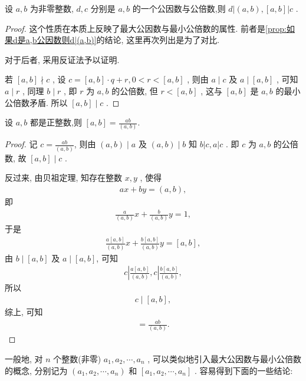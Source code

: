 \begin{property}
	设 $a ,  b$ 为非零整数, $d ,  c$ 分别是 $a ,  b$ 的一个公因数与公倍数,则 $d|(a, b),[a, b]| c$ .
\end{property}
\begin{proof}
	这个性质在本质上反映了最大公因数与最小公倍数的属性. 前者是\autoref{prop:如果d是a,b公因数则d|(a,b)}的结论, 这里再次列出是为了对比.

	对于后者, 采用反证法予以证明.

	若 $[a, b] \nmid c$ , 设 $c=[a, b] \cdot q+r, 0<r<[a, b]$ , 则由 $a \mid c$ 及 $a \mid[a, b]$ , 可知 $a \mid r$ , 同理 $b \mid r$ , 即 $r$ 为 $a ,  b$ 的公倍数, 但 $r<[a, b]$ , 这与 $[a, b]$ 是 $a ,  b$ 的最小公倍数矛盾. 所以 $[a, b] \mid c$ .
\end{proof}

\begin{property}\label{prop:最大公因数与最小公倍数的关系}
	设 $a ,  b$ 都是正整数,则 $[a, b]=\frac{a b}{(a, b)}$.
\end{property}
\begin{proof}
	记 $c=\frac{a b}{(a, b)}$, 则由 $(a, b) \mid a$ 及 $(a, b) \mid b$ 知 $b|c, a| c$ . 即 $c$ 为 $a ,  b$ 的公倍数, 故 $[a, b] \mid c$ .

	反过来, 由贝祖定理, 知存在整数 $x ,  y$ , 使得
	\begin{align*}
		a x+b y=(a, b),
	\end{align*}
	即
	\begin{align*}
		\frac{a}{(a, b)} x+\frac{b}{(a, b)} y=1,
	\end{align*}
	于是
	\begin{align*}
		\frac{a[a, b]}{(a, b)} x+\frac{b[a, b]}{(a, b)} y=[a, b],
	\end{align*}
	由 $b \mid[a, b]$ 及 $a \mid[a, b]$, 可知
	\begin{align*}
		c\left|\frac{a[a, b]}{(a, b)}, c\right| \frac{b[a, b]}{(a, b)},
	\end{align*}
	所以
	\begin{align*}
		c \mid[a, b],
	\end{align*}
	综上, 可知
	\begin{align*}
		[a, b]=\frac{a b}{(a, b)}.
	\end{align*}
\end{proof}

一般地, 对 $n$ 个整数(非零) $a_{1}, a_{2}, \cdots, a_{n}$ , 可以类似地引入最大公因数与最小公倍数的概念, 分别记为 $\left(a_{1}, a_{2}, \cdots, a_{n}\right)$ 和 $\left[a_{1}, a_{2}, \cdots, a_{n}\right]$ . 容易得到下面的一些结论:

